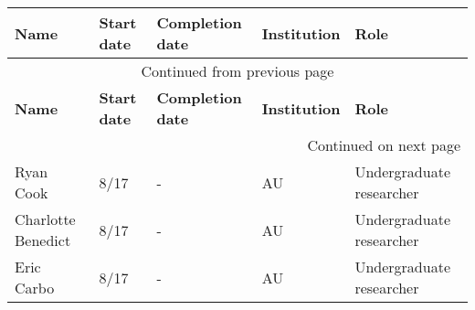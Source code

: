 \begin{longtable}[l]{ @{} p{1.2in} p{0.5in} p{0.8in}p{0.75in} p{2in} @{} }
    \hline
    \textbf{Name} & \textbf{Start date} & \textbf{Completion date} & \textbf{Institution} & \textbf{Role} \\
    \hline
    \endfirsthead
    \multicolumn{5}{c}{{Continued from previous page}} \\
    \hline
    \textbf{Name} & \textbf{Start date} & \textbf{Completion date} & \textbf{Institution} & \textbf{Role} \\
    \hline
    \endhead
    \hline \multicolumn{5}{r}{{Continued on next page}} \\
    \endfoot
    \hline
    \endlastfoot
    Ryan Cook & 8/17 & - & AU & Undergraduate researcher \\
    Charlotte Benedict & 8/17 & - & AU & Undergraduate researcher \\
    Eric Carbo & 8/17 & - & AU & Undergraduate researcher \\
\end{longtable}
